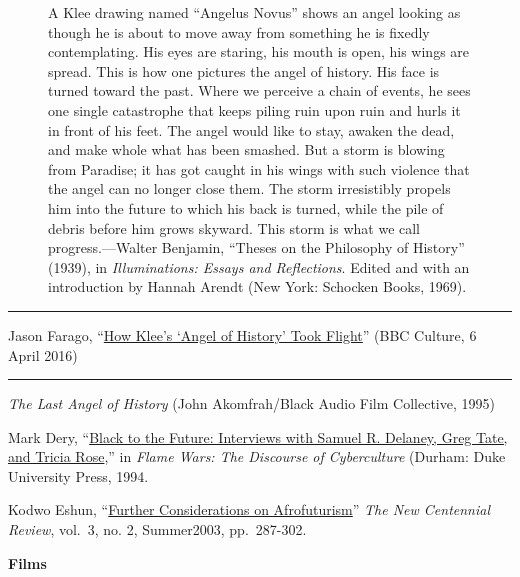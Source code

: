 \documentclass[
  letterpaper,
  DIV=11,
  numbers=noendperiod]{scrartcl}
\begin{document}
\begin{figure}
\begin{minipage}[t]{0.49\linewidth}
{\centering 

A Klee drawing named ``Angelus Novus'' shows an angel looking as though
he is about to move away from something he is fixedly contemplating. His
eyes are staring, his mouth is open, his wings are spread. This is how
one pictures the angel of history. His face is turned toward the past.
Where we perceive a chain of events, he sees one single catastrophe that
keeps piling ruin upon ruin and hurls it in front of his feet. The angel
would like to stay, awaken the dead, and make whole what has been
smashed. But a storm is blowing from Paradise; it has got caught in his
wings with such violence that the angel can no longer close them. The
storm irresistibly propels him into the future to which his back is
turned, while the pile of debris before him grows skyward. This storm is
what we call progress.---Walter Benjamin, ``Theses on the Philosophy of
History'' (1939), in \emph{Illuminations: Essays and Reflections}.
Edited and with an introduction by Hannah Arendt (New York: Schocken
Books, 1969).

}

\end{minipage}%

\end{figure}

\begin{center}\rule{0.5\linewidth}{0.5pt}\end{center}

Jason Farago,
``\href{https://www.bbc.com/culture/article/20160401-how-klees-angel-of-history-took-flight}{How
Klee's `Angel of History' Took Flight}'' (BBC Culture, 6 April 2016)

\begin{center}\rule{0.5\linewidth}{0.5pt}\end{center}

\emph{The Last Angel of History} (John Akomfrah/Black Audio Film
Collective, 1995)

Mark Dery,
``\href{https://canvas.emerson.edu/courses/1932613/files/145602338?wrap=1}{Black
to the Future: Interviews with Samuel R. Delaney, Greg Tate, and Tricia
Rose},'' in \emph{Flame Wars: The Discourse of Cyberculture} (Durham:
Duke University Press, 1994.

Kodwo Eshun,
``\href{https://canvas.emerson.edu/courses/1932613/files/145602336?wrap=1}{Further
Considerations on Afrofuturism}'' \emph{The New Centennial Review},
vol.~3, no. 2, Summer2003, pp.~287-302.

\textbf{Films}
\end{document}
